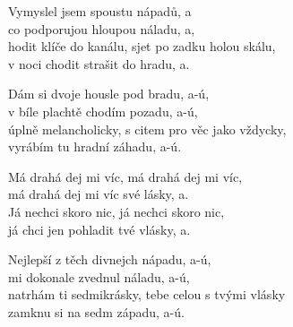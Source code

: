 
\ve{}
Vymyslel jsem spoustu nápadů, a\\
co podporujou hloupou náladu, a,\\
hodit klíče do kanálu, sjet po zadku holou skálu,\\
v noci chodit strašit do hradu, a.

\ve{}
Dám si dvoje housle pod bradu, a-ú,\\
v bíle plachtě chodím pozadu, a-ú,\\
úplně melancholicky, s citem pro věc jako vždycky,\\
vyrábím tu hradní záhadu, a-ú.

\cho{}
Má drahá dej mi víc, má drahá dej mi víc,\\
má drahá dej mi víc své lásky, a.\\
Já nechci skoro nic, já nechci skoro nic,\\
já chci jen pohladit tvé vlásky, a.

\ve{}
Nejlepší z těch divnejch nápadu, a-ú,\\
mi dokonale zvednul náladu, a-ú,\\
natrhám ti sedmikrásky, tebe celou s tvými vlásky\\
zamknu si na sedm západu, a-ú.

\cho{}

\esong